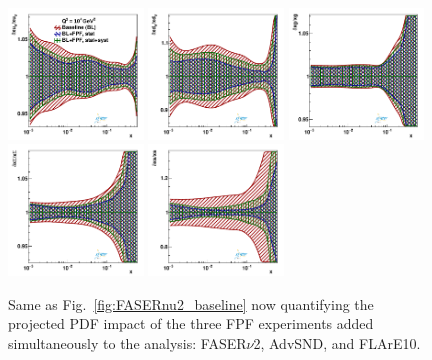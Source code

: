 \begin{figure}[t]
\centering
\includegraphics[width=0.32\textwidth]{plots/proton_fpf/fred05fcorr05_FPF_q2_10000_pdf_uv_ratio.pdf}
\includegraphics[width=0.32\textwidth]{plots/proton_fpf/fred05fcorr05_FPF_q2_10000_pdf_dv_ratio.pdf}
\includegraphics[width=0.32\textwidth]{plots/proton_fpf/fred05fcorr05_FPF_q2_10000_pdf_g_ratio.pdf}\\
\includegraphics[width=0.32\textwidth]{plots/proton_fpf/fred05fcorr05_FPF_q2_10000_pdf_Sea_ratio.pdf}
\includegraphics[width=0.32\textwidth]{plots/proton_fpf/fred05fcorr05_FPF_q2_10000_pdf_s_ratio.pdf}
\caption{
  Same as Fig.~\ref{fig:FASERnu2_baseline} now quantifying the
  projected PDF impact of the three FPF experiments added simultaneously to
  the analysis: FASER$\nu$2, AdvSND, and FLArE10. 
}
\label{fig:FPF_combined}
\end{figure}

